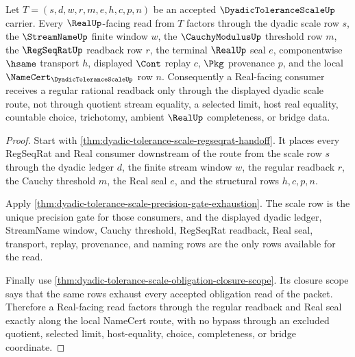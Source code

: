 \begin{theorem}
\label{thm:dyadic-tolerance-scale-real-regular-readback}
Let $T=(s,d,w,r,m,e,h,c,p,n)$ be an accepted $\DyadicToleranceScaleUp$ carrier. Every $\RealUp$-facing read from $T$ factors through the dyadic scale row $s$, the $\StreamNameUp$ finite window $w$, the $\CauchyModulusUp$ threshold row $m$, the $\RegSeqRatUp$ readback row $r$, the terminal $\RealUp$ seal $e$, componentwise $\hsame$ transport $h$, displayed $\Cont$ replay $c$, $\Pkg$ provenance $p$, and the local $\NameCert_{\DyadicToleranceScaleUp}$ row $n$. Consequently a Real-facing consumer receives a regular rational readback only through the displayed dyadic scale route, not through quotient stream equality, a selected limit, host real equality, countable choice, trichotomy, ambient $\RealUp$ completeness, or bridge data.
\end{theorem}
\begin{proof}
Start with \autoref{thm:dyadic-tolerance-scale-regseqrat-handoff}. It places every RegSeqRat and Real consumer downstream of the route from the scale row $s$ through the dyadic ledger $d$, the finite stream window $w$, the regular readback $r$, the Cauchy threshold $m$, the Real seal $e$, and the structural rows $h,c,p,n$.

Apply \autoref{thm:dyadic-tolerance-scale-precision-gate-exhaustion}. The scale row is the unique precision gate for those consumers, and the displayed dyadic ledger, StreamName window, Cauchy threshold, RegSeqRat readback, Real seal, transport, replay, provenance, and naming rows are the only rows available for the read.

Finally use \autoref{thm:dyadic-tolerance-scale-obligation-closure-scope}. Its closure scope says that the same rows exhaust every accepted obligation read of the packet. Therefore a Real-facing read factors through the regular readback and Real seal exactly along the local NameCert route, with no bypass through an excluded quotient, selected limit, host-equality, choice, completeness, or bridge coordinate.
\end{proof}


